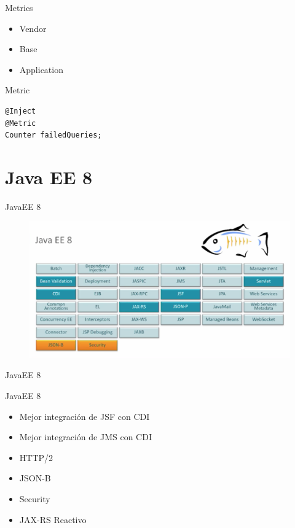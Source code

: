 \documentclass{beamer}
\begin{document}
\begin{frame}{Metrics}

\begin{itemize}
	\item Vendor
	\item Base
	\item Application
\end{itemize}

\end{frame}

\begin{frame}[fragile]{Metric}
\begin{lstlisting}
@Inject
@Metric
Counter failedQueries;
\end{lstlisting}
\end{frame}



\section{Java EE 8}
\begin{frame}{JavaEE 8}
\begin{figure}
	\centering
	\includegraphics[width=0.9\linewidth]{Images/javaee8}
\end{figure}
\end{frame}


\begin{frame}{JavaEE 8}
\begin{alertblock}{JavaEE 8}
\begin{itemize}
	\item Mejor integración de JSF con CDI
	\item Mejor integración de JMS con CDI
	\item HTTP/2
	\item JSON-B
	\item Security
	\item JAX-RS Reactivo
\end{itemize}
\end{alertblock}
\end{frame}
\end{document}
